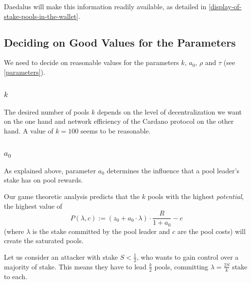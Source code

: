 \documentclass[11pt,a4paper]{article}
\begin{document}
Daedalus will make this information readily available, as detailed in
\cref{display-of-stake-pools-in-the-wallet}. 

\subsection{Deciding on Good Values for the Parameters}
\label{deciding-on-good-values-for-the-parameters}

We need to decide on reasonable values for the parameters \(k\),
\(a_0\), \(\rho\) and \(\tau\) (see \cref{parameters}).

\subsubsection{\texorpdfstring{\(k\)}{k}}

The desired number of pools \(k\) depends on the level of
decentralization we want on the one hand and network efficiency of the
Cardano protocol on the other hand. A value of \(k=100\) seems to be
reasonable.

\subsubsection{\texorpdfstring{\(a_0\)}{a\_0}}

As explained above, parameter \(a_0\) determines the influence that a
pool leader's stake has on pool rewards.

Our game theoretic analysis predicts that the \(k\) pools with the
highest \emph{potential}, the highest value of \[
    P(\lambda,c):=\left(z_0+a_0\cdot\lambda\right)\cdot\frac{R}{1+a_0}-c
\] (where \(\lambda\) is the stake committed by the pool leader and \(c\)
are the pool costs) will create the saturated pools.

Let us consider an attacker with stake \(S < \frac{1}{2}\), who wants to
gain control over a majority of stake. This means they have to lead
\(\frac{k}{2}\) pools, committing \(\lambda=\frac{2S}{k}\) stake to
each.
\end{document}
